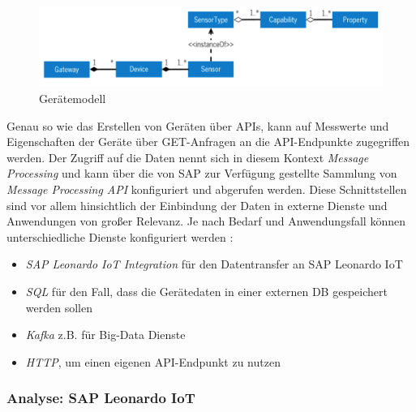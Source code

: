 \begin{figure}[h]
  \centering
  \includegraphics[width=1.0\linewidth]{pictures/device_model}
  \caption[Gerätemodell]{Gerätemodell}
  \label{fig:devicemodel}
\end{figure}

\noindent Genau so wie das Erstellen von Geräten über APIs, kann auf Messwerte und Eigenschaften der Geräte über GET-Anfragen an die API-Endpunkte zugegriffen werden. Der Zugriff auf die Daten nennt sich in diesem  Kontext \textit{Message Processing} und kann über die von SAP zur Verfügung gestellte Sammlung von \textit{Message Processing API} konfiguriert und abgerufen werden. Diese Schnittstellen sind vor allem hinsichtlich der Einbindung der Daten in externe Dienste und Anwendungen von großer Relevanz. Je nach Bedarf und Anwendungsfall können unterschiedliche Dienste konfiguriert werden \citep{SAP2020}:
\begin{itemize}
  \item \textit{SAP Leonardo IoT Integration} für den Datentransfer an SAP Leonardo IoT
  \item \textit{SQL} für den Fall, dass die Gerätedaten in einer externen DB gespeichert werden sollen
  \item \textit{Kafka} z.B. für Big-Data Dienste
  \item \textit{HTTP}, um einen eigenen API-Endpunkt zu nutzen
\end{itemize}

\subsubsection{Analyse: SAP Leonardo IoT}

